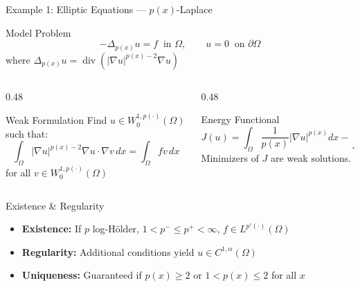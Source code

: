 \documentclass[11pt]{beamer}
\let\oldcite\cite
\renewcommand{\cite}[1]{\textcolor{red}{\textbf{\oldcite{#1}}}}
\begin{document}
	\begin{frame}[allowframebreaks]{Example 1: Elliptic Equations — $p(x)$-Laplace \cite{fan2015}}
		\begin{block}{Model Problem}
			\[
			-\Delta_{p(x)} u = f \ \text{ in } \Omega, \qquad u = 0 \ \text{ on } \partial\Omega
			\]
			where $\Delta_{p(x)} u = \operatorname{div}\left(|\nabla u|^{p(x)-2}\nabla u\right)$
		\end{block}
		
		\begin{columns}[T]
			\begin{column}{0.48\textwidth}
				\begin{block}{Weak Formulation}
					\small
					Find $u \in W_0^{1, p(\cdot)}(\Omega)$ such that:
					\[
					\int_\Omega |\nabla u|^{p(x)-2}\nabla u \cdot \nabla v \, dx = \int_\Omega f v \, dx
					\]
					for all $v \in W_0^{1, p(\cdot)}(\Omega)$
				\end{block}
			\end{column}
			
			\begin{column}{0.48\textwidth}
				\begin{block}{Energy Functional}
					\small
					\[
					J(u) = \int_\Omega \frac{1}{p(x)} |\nabla u|^{p(x)} dx - \int_\Omega f u \, dx
					\]
					Minimizers of $J$ are weak solutions.
				\end{block}
			\end{column}
		\end{columns}
		
		\begin{block}{Existence \& Regularity}
			\begin{itemize}
				\item \textbf{Existence:} If $p$ log-Hölder, $1 < p^- \le p^+ < \infty$, $f \in L^{p'(\cdot)}(\Omega)$
				\item \textbf{Regularity:} Additional conditions yield $u \in C^{1, \alpha}(\Omega)$ \cite{diening2011}
				\item \textbf{Uniqueness:} Guaranteed if $p(x) \ge 2$ or $1 < p(x) \le 2$ for all $x$
			\end{itemize}
		\end{block}
	\end{frame}
	
\end{document}
